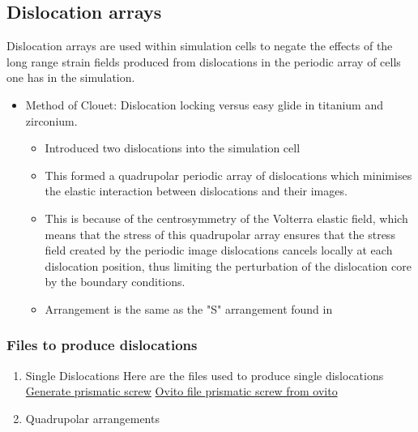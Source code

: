 \documentclass[11pt]{article}
\begin{document}
\subsection{Dislocation arrays}
\label{sec-2-1}
Dislocation arrays are used within simulation cells to negate the effects of
the long range strain fields produced from dislocations in the periodic array
of cells one has in the simulation.
\begin{itemize}
\item Method of Clouet: Dislocation locking versus easy glide in titanium and
zirconium. \cite{Clouet2015}
\begin{itemize}
\item Introduced two dislocations into the simulation cell
\item This formed a quadrupolar periodic array of dislocations which
minimises the elastic interaction between dislocations and their
images.
\item This is because of the centrosymmetry of the Volterra elastic field,
which means that the stress of this quadrupolar array ensures that the
stress field created by the periodic image dislocations cancels locally
at each dislocation position, thus limiting the perturbation of the
dislocation core by the boundary conditions.
\item Arrangement is the same as the "S" arrangement found in
\cite{Clouet2012}
\end{itemize}
\end{itemize}

\subsubsection{Files to produce dislocations}
\label{sec-2-1-1}
\begin{enumerate}
\item Single Dislocations
\label{sec-2-1-1-1}
Here are the files used to produce single dislocations
\href{file:///home/tigany/Documents/disl_gsurf/useful_python/bop/dislocations/create_dislocations/gen_prismatic_screw_tbe.py}{Generate prismatic screw} \href{file:///home/tigany/Documents/disl_gsurf/useful_python/bop/dislocations/create_dislocations/test/generated_dislocations/site.ti_9x_9y_8z_square_1_dislanis_prim_rot_convert.xyz}{Ovito file }
\href{file:///home/tigany/Pictures/prismatic_screw_tbe_full_anis.png}{prismatic screw from ovito }
\item Quadrupolar arrangements
\label{sec-2-1-1-2}
\end{enumerate}
\end{document}
